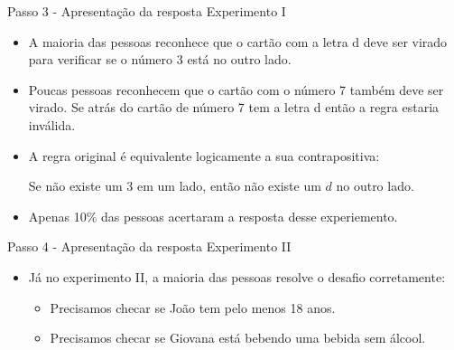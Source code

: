 \documentclass{beamer}
\begin{document}
\begin{frame}{Passo 3 - Apresentação da resposta Experimento I}

\begin{itemize}

\item <1->A maioria das pessoas reconhece que o cartão com a letra d deve ser virado para verificar se o número 3 está no outro lado.

\item <2->Poucas pessoas reconhecem que o cartão com o número 7 também deve ser virado. Se atrás do cartão de número 7 tem a letra d então a regra estaria inválida.

\item <3->A regra original é equivalente logicamente a sua contrapositiva:

\begin{center}
Se não existe um $3$ em um lado, então não existe um $d$ no outro lado.
\end{center}

\item Apenas 10\% das pessoas acertaram a resposta desse experiemento.

\end{itemize}


\end{frame}


\begin{frame}{Passo 4 - Apresentação da resposta Experimento II}

\begin{itemize}

\item Já no experimento II, a maioria das pessoas resolve o desafio corretamente:

\begin{itemize}
    \item Precisamos checar se João tem pelo menos 18 anos.
    \item Precisamos checar se  Giovana está bebendo uma bebida sem álcool.
\end{itemize}



\end{itemize}


\end{frame}

\end{document}
